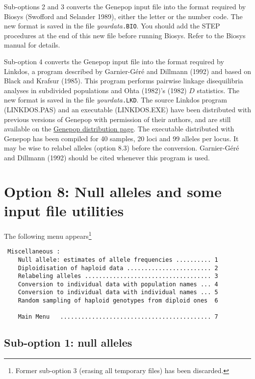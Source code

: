 \documentclass[12pt,]{book}
\let\rmarkdownfootnote\footnote%
\def\footnote{\protect\rmarkdownfootnote}
\theoremstyle{definition}
\theoremstyle{definition}
\theoremstyle{definition}
\theoremstyle{remark}
\begin{document}
Sub-options 2 and 3 converts the Genepop input file into the format
required by Biosys (Swofford and Selander 1989),
either the letter or the number code. The new format is saved in the
file \emph{yourdata}\texttt{.BIO}. You should add the STEP procedures at
the end of this new file before running Biosys. Refer to the Biosys
manual for details.

Sub-option 4 converts the Genepop input file into the format required by
Linkdos, a program described by Garnier-Géré and
Dillmann (1992) and based on Black and Krafsur (1985). This program
performs pairwise linkage disequilibria analyses in subdivided
populations and Ohta (1982)'s (1982) \(D\)
statistics. The new
format is saved in the file \emph{yourdata}\texttt{.LKD}. The source
Linkdos program (LINKDOS.PAS) and an executable (LINKDOS.EXE) have been
distributed with previous versions of Genepop with permission of their
authors, and are still available on the
\href{http://kimura.univ-montp2.fr/~rousset/Genepop.htm}{Genepop
distribution page}. The executable distributed with Genepop has been
compiled for 40 samples, 20 loci and 99 alleles per locus. It may be
wise to relabel alleles (option 8.3) before the conversion. Garnier-Géré
and Dillmann (1992) should be cited whenever this program is used.

\section{Option 8: Null alleles and some input file
utilities}\label{option-8-null-alleles-and-some-input-file-utilities}

The following menu appears\footnote{Former sub-option 3 (erasing all
  temporary files) has been discarded.}

\begin{verbatim}
 Miscellaneous :
    Null allele: estimates of allele frequencies .......... 1
    Diploidisation of haploid data ........................ 2
    Relabeling alleles .................................... 3
    Conversion to individual data with population names ... 4
    Conversion to individual data with individual names ... 5
    Random sampling of haploid genotypes from diploid ones  6

    Main Menu   ........................................... 7
\end{verbatim}

\subsection{Sub-option 1: null alleles}\label{sub-option-1-null-alleles}
\end{document}

